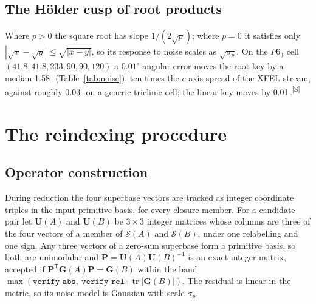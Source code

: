 \documentclass[preprint,pdf]{iucr}          %
\makeatletter
\newcommand{\Ang}{\text{\AA}}
\newcommand{\Gmet}{\mathbf{G}}
\newcommand{\Pop}{\mathbf{P}}
\newcommand{\Uop}{\mathbf{U}}
\newcommand{\Sclosure}{\mathcal{S}}
\newcommand{\tr}{\operatorname{tr}}
\newcommand{\chk}[1]{\textsuperscript{[S\@nameuse{zn@#1}]}}
\makeatother
\begin{document}
\subsection{The H\"older cusp of root products}
Where $p>0$ the square root has slope $1/(2\sqrt p)$; where $p=0$ it satisfies only $|\sqrt x-\sqrt y|\le\sqrt{|x-y|}$, so its response to noise scales as $\sqrt{\sigma_p}$. On the $P6_3$ cell $(41.8,41.8,233,90,90,120)$ a $0.01^\circ$ angular error moves the root key by a median 1.58\,\Ang\ (Table~\ref{tab:noise}), ten times the $c$-axis spread of the XFEL stream, against roughly 0.03\,\Ang\ on a generic triclinic cell; the linear key moves by 0.01\,\Ang.\chk{z:noise}

\section{The reindexing procedure}
\label{app:exact}

\subsection{Operator construction}
During reduction the four superbase vectors are tracked as integer coordinate triples in the input primitive basis, for every closure member. For a candidate pair let $\Uop(A)$ and $\Uop(B)$ be $3\times3$ integer matrices whose columns are three of the four vectors of a member of $\Sclosure(A)$ and $\Sclosure(B)$, under one relabelling and one sign. Any three vectors of a zero-sum superbase form a primitive basis, so both are unimodular and $\Pop=\Uop(A)\Uop(B)^{-1}$ is an exact integer matrix, accepted if $\Pop^{\mathsf T}\Gmet(A)\Pop=\Gmet(B)$ within the band $\max(\texttt{verify\_abs},\ \texttt{verify\_rel}\cdot\tr|\Gmet(B)|)$. The residual is linear in the metric, so its noise model is Gaussian with scale $\sigma_p$.
\end{document}
